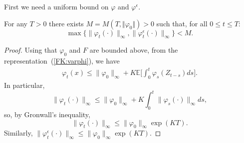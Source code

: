 \documentclass[EJP]{ejpecp} %
\newcommand{\IE}{\mathbb E}
\begin{document}
First we need a uniform bound on $\varphi$ and $\varphi^\epsilon$.  
\begin{lemma} 
\label{BoundednessVarphis}
For any $T>0$ there exists $M = M(T, \Vert \varphi_0 \Vert) >0$ such that, 
for all $0 \leq t \leq T$:
\[ \max\{ \| \varphi_t(\cdot) \|_\infty, \| \varphi^\epsilon_t(\cdot) \|_\infty\} 
< M.
 \]
\end{lemma}
\begin{proof}
Using that $\varphi_0$ and $F$ are bounded above, from the
representation~(\ref{FK:varphi}), we have
\begin{align*}
\varphi_t(x) \leq \| \varphi_0 \|_\infty + 
    K \IE\Big[\int_0^t \varphi_s(Z_{t-s}) ds\Big].
\end{align*}
In particular, %
\[ \| \varphi_t(\cdot) \|_\infty \leq \| \varphi_0 \|_\infty
+  K \int_0^t \| \varphi_s(\cdot) \|_\infty ds, \]
so, by Gronwall's inequality,
\[ \| \varphi_t(\cdot) \|_\infty \leq \| \varphi_0 \|_\infty \exp\left( K T \right). \]
Similarly,
$\| \varphi^\epsilon_t(\cdot) \|_{\infty} \leq \| \varphi_0 \|_\infty \exp\left( K T \right) $.
\end{proof}
\end{document}
